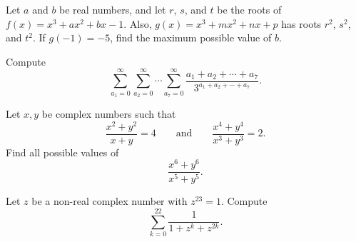 \documentclass[11pt]{article}
\theoremstyle{definition}
\begin{document}
%	





\begin{question}[name={2013 HMMT, Algebra, \href{https://artofproblemsolving.com/community/c129h521096p2935118}{Problem 5}}]
	Let $a$ and $b$ be real numbers, and let $r$, $s$, and $t$ be the roots of $f(x)=x^3+ax^2+bx-1$. Also, $g(x)=x^3+mx^2+nx+p$ has roots $r^2$, $s^2$, and $t^2$. If $g(-1)=-5$, find the maximum possible value of $b$.	
\end{question}




%	




\begin{question}[name={2013 HMMT, Algebra, \href{https://artofproblemsolving.com/community/c129h521098p2935121}{Problem 7}}]
	Compute\[\sum_{a_1=0}^\infty\sum_{a_2=0}^\infty\cdots\sum_{a_7=0}^\infty\dfrac{a_1+a_2+\cdots+a_7}{3^{a_1+a_2+\cdots+a_7}}.\]
\end{question}




%	




\begin{question}[name={2013 HMMT, Algebra, \href{https://artofproblemsolving.com/community/c129h521099p2935122}{Problem 8}}]
	Let $x,y$ be complex numbers such that $$\frac{x^2+y^2}{x+y}=4 \qquad \text{and} \qquad \frac{x^4+y^4}{x^3+y^3}=2.$$ Find all possible values of $$\frac{x^6+y^6}{x^5+y^5}.$$
\end{question}




%	




\begin{question}[name={2013 HMMT, Algebra, \href{https://artofproblemsolving.com/community/c129h521101p2935125}{Problem 9}}]
	Let $z$ be a non-real complex number with $z^{23}=1$. Compute\[\sum_{k=0}^{22}\dfrac{1}{1+z^k+z^{2k}}.\]
\end{question}
\end{document}
